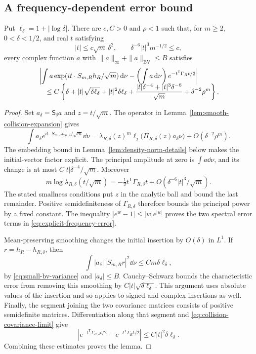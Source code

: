 \subsection{A frequency-dependent error bound}
\begin{lemma}
\label{lem:explicit-frequency-error}
Put $\ell_\delta=1+|\log\delta|$. There are $c,C>0$ and $\rho<1$
such that, for $m\ge2$, $0<\delta<1/2$, and real $t$ satisfying
\[
 |t|\le c\sqrt m\,\delta^2,\qquad
 \delta^{-6}|t|^3m^{-1/2}\le c,
\]
every complex function $a$ with
$\|a\|_\infty+\|a\|_{\mathrm{BV}}\le B$ satisfies
\begin{align}
 &\left|\int a\exp(it\cdot S_{m,R}h_R/\sqrt m)\,\mathrm d\nu
       -\left(\int a\,\mathrm d\nu\right)e^{-t^{\mathsf T}\Gamma_Rt/2}\right|
       \notag\\[-2mm]
 &\quad\le C\left\{
 \delta+|t|\sqrt{\delta\ell_\delta}+|t|^2\delta\ell_\delta
 +\frac{|t|\delta^{-4}+|t|^3\delta^{-6}}{\sqrt m}
 +\delta^{-2}\rho^m\right\}.\label{eq:explicit-frequency-error}
\end{align}
\end{lemma}
\begin{proof}
Set $a_\delta=\mathsf S_\delta a$ and $z=t/\sqrt m$.
The operator in Lemma~\ref{lem:smooth-collision-expansion} gives
\[
 \int a_\delta e^{it\cdot S_{m,R}h_{R,\delta}/\sqrt m}\dd\nu
 =\lambda_{R,\delta}(z)^m
   \ell_j\bigl(\Pi_{R,\delta}(z)a_\delta\nu\bigr)
       +O(\delta^{-2}\rho^m).
\]
The embedding bound in Lemma~\ref{lem:density-norm-details} below
makes the initial-vector factor explicit. The principal amplitude
at zero is $\int a\dd\nu$, and its change is at most
$C|t|\delta^{-4}/\sqrt m$. Moreover
\[
 m\log\lambda_{R,\delta}(t/\sqrt m)
 =-\tfrac12t^{\mathsf T}\Gamma_{R,\delta}t
       +O(\delta^{-6}|t|^3/\sqrt m).
\]
The stated smallness conditions put $z$ in the analytic ball and bound
the last remainder. Positive semidefiniteness of
$\Gamma_{R,\delta}$ therefore bounds the principal power by a fixed
constant. The inequality $|e^w-1|\le |w|e^{|w|}$ proves the two
spectral error terms in \eqref{eq:explicit-frequency-error}.

Mean-preserving smoothing changes the initial insertion by $O(\delta)$
in $L^1$. If $r=h_R-h_{R,\delta}$, then
\[
 \int |a_\delta|\,|S_{m,R}r|^2\dd\nu
       \le C m\delta\ell_\delta,
\]
by \eqref{eq:small-bv-variance} and $|a_\delta|\le B$.
Cauchy--Schwarz bounds the characteristic error from removing this
smoothing by $C|t|\sqrt{\delta\ell_\delta}$. This argument uses
absolute values of the insertion and so applies to signed and complex
insertions as well. Finally, the segment joining the two covariance
matrices consists of positive semidefinite matrices. Differentiation
along that segment and \eqref{eq:collision-covariance-limit} give
\[
 \left|e^{-t^{\mathsf T}\Gamma_{R,\delta}t/2}
             -e^{-t^{\mathsf T}\Gamma_Rt/2}\right|
       \le C|t|^2\delta\ell_\delta.
\]
Combining these estimates proves the lemma.
\end{proof}


